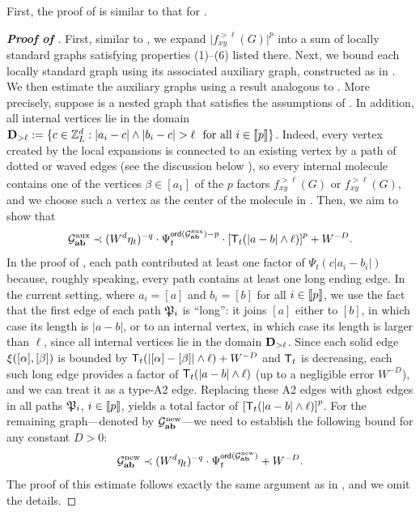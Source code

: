 First, the proof of  is similar to that for .
\begin{proof}[\bf Proof of ]
First, similar to , we expand $\big|f_{xy}^{>\ell}(G)\big|^{p}$ into a sum of locally standard graphs satisfying properties (1)--(6) listed there. Next, we bound each locally standard graph using its associated auxiliary graph, constructed as in .
We then estimate the auxiliary graphs using a result analogous to . More precisely, suppose  is a nested graph that satisfies the assumptions of . In addition, all internal vertices lie in the domain  $\bD_{>\ell}:=\{c \in \Zn:|a_i-c|\wedge |b_i-c|> \ell \ \text{ for all } i\in\qqq{p}\}$. Indeed, every vertex created by the local expansions is connected to an existing vertex by a path of dotted or waved edges (see the discussion below ), so every internal molecule contains one of the vertices $\beta\in[a_1]$ of the $p$ factors $f_{xy}^{>\ell}(G)$ or $\overline{f_{xy}^{>\ell}(G)}$, and we choose such a vertex as the center of the molecule in . Then, we aim to show that
\begin{equation}\label{adsuu33}
\mathcal G^{\mathrm{aux}}_{{\mathbf{a}}{\mathbf{b}}} \prec (W^d\eta_t)^{-q}\cdot \Psi_t^{{\mathsf{ord}}(\mathcal G^{\mathrm{aux}}_{{\mathbf{a}}{\mathbf{b}}})-p}\cdot \left[{{\mathsf T}_{t}(|a-b|\wedge \ell) }\right]^{p}+W^{-D} .
\end{equation}
In the proof of , each path contributed at least one factor of $\Psi_t(c|a_i-b_i|)$ because, roughly speaking, every path contains at least one long ending edge. In the current setting, where $a_i=[a]$ and $b_i=[b]$ for all $i\in\llbracket{p}\rrbracket$, we use the fact that the first edge of each path $\mathfrak{P}_i$ is ``long'': it joins $[a]$ either to $[b]$, in which case its length is $|a-b|$, or to an internal vertex, in which case its length is larger than $\ell$, since all internal vertices lie in the domain ${\mathbf{D}}_{>\ell}$.
Since each solid edge $\xi([\alpha],[\beta])$ is bounded by ${\mathsf T}_t(|[\alpha]-[\beta]|\wedge\ell)+W^{-D}$ and ${\mathsf T}_t$ is decreasing, each such long edge provides a factor of ${\mathsf T}_t(|a-b|\wedge\ell)$ (up to a negligible error $W^{-D}$), and we can treat it as a type-A2 edge. Replacing these A2 edges with ghost edges in all paths $\mathfrak{P}_i$, $i\in \llbracket{p}\rrbracket$, yields a total factor of $\left[{{\mathsf T}_{t}(|a-b|\wedge\ell)}\right]^{p}$. For the remaining graph---denoted by \(\mathcal G^{\mathrm{new}}_{{\mathbf{a}}{\mathbf{b}}}\)---we need to establish the following bound for any constant $D>0$:
\begin{equation}\label{adsuu44}
\mathcal G^{\mathrm{new}}_{{\mathbf{a}}{\mathbf{b}}} \prec (W^d\eta_t)^{-q}\cdot \Psi_t^{{\mathsf{ord}}(\mathcal G^{\mathrm{new}}_{{\mathbf{a}}{\mathbf{b}}})} +W^{-D} .
\end{equation}
The proof of this estimate follows exactly the same argument as in , and we omit the details.
\end{proof}

